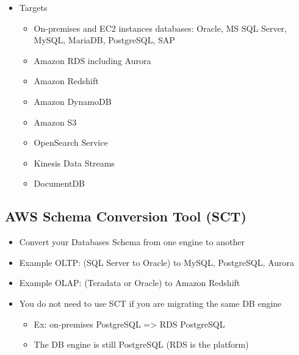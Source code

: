 {{\begin{itemize}
    \item Targets
    \begin{itemize}
        \item On-premises and EC2 instances databases: Oracle, MS SQL Server, MySQL, MariaDB, PostgreSQL, SAP
        \item Amazon RDS including Aurora
        \item Amazon Redshift
        \item Amazon DynamoDB
        \item Amazon S3
        \item OpenSearch Service
        \item Kinesis Data Streams
        \item DocumentDB
    \end{itemize}
\end{itemize}

\subsection{AWS Schema Conversion Tool (SCT)}
\begin{itemize}
    \item Convert your Databases Schema from one engine to another
    \item Example OLTP: (SQL Server to Oracle) to MySQL, PostgreSQL, Aurora
    \item Example OLAP: (Teradata or Oracle) to Amazon Redshift
    \item You do not need to use SCT if you are migrating the same DB engine
    \begin{itemize}
        \item Ex: on-premises PostgreSQL => RDS PostgreSQL
        \item The DB engine is still PostgreSQL (RDS is the platform)
    \end{itemize}
\end{itemize}

}}

